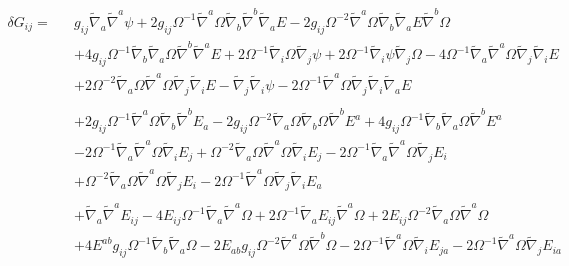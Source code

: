 \documentclass[10pt,letterpaper]{article}
\numberwithin{equation}{section}
\begin{document}
\begin{eqnarray}
\delta G_{ij}=&&g_{ij} \tilde{\nabla}_{a}\tilde{\nabla}^{a}\psi
 + 2 g_{ij} \Omega^{-1} \tilde{\nabla}^{a}\Omega \tilde{\nabla}_{b}\tilde{\nabla}^{b}\tilde{\nabla}_{a}E
 - 2 g_{ij} \Omega^{-2} \tilde{\nabla}^{a}\Omega \tilde{\nabla}_{b}\tilde{\nabla}_{a}E \tilde{\nabla}^{b}\Omega\nonumber\\
&& + 4 g_{ij} \Omega^{-1} \tilde{\nabla}_{b}\tilde{\nabla}_{a}\Omega \tilde{\nabla}^{b}\tilde{\nabla}^{a}E
 + 2 \Omega^{-1} \tilde{\nabla}_{i}\Omega \tilde{\nabla}_{j}\psi
 + 2 \Omega^{-1} \tilde{\nabla}_{i}\psi \tilde{\nabla}_{j}\Omega
 - 4 \Omega^{-1} \tilde{\nabla}_{a}\tilde{\nabla}^{a}\Omega \tilde{\nabla}_{j}\tilde{\nabla}_{i}E
\nonumber\\
&& + 2 \Omega^{-2} \tilde{\nabla}_{a}\Omega \tilde{\nabla}^{a}\Omega \tilde{\nabla}_{j}\tilde{\nabla}_{i}E
 -  \tilde{\nabla}_{j}\tilde{\nabla}_{i}\psi
 - 2 \Omega^{-1} \tilde{\nabla}^{a}\Omega \tilde{\nabla}_{j}\tilde{\nabla}_{i}\tilde{\nabla}_{a}E
\nonumber\\ \nonumber\\
&& +2 g_{ij} \Omega^{-1} \tilde{\nabla}^{a}\Omega \tilde{\nabla}_{b}\tilde{\nabla}^{b}E_{a}
 - 2 g_{ij} \Omega^{-2} \tilde{\nabla}_{a}\Omega \tilde{\nabla}_{b}\Omega \tilde{\nabla}^{b}E^{a}
 + 4 g_{ij} \Omega^{-1} \tilde{\nabla}_{b}\tilde{\nabla}_{a}\Omega \tilde{\nabla}^{b}E^{a}
\nonumber\\
&& - 2 \Omega^{-1} \tilde{\nabla}_{a}\tilde{\nabla}^{a}\Omega \tilde{\nabla}_{i}E_{j}
 + \Omega^{-2} \tilde{\nabla}_{a}\Omega \tilde{\nabla}^{a}\Omega \tilde{\nabla}_{i}E_{j}
 - 2 \Omega^{-1} \tilde{\nabla}_{a}\tilde{\nabla}^{a}\Omega \tilde{\nabla}_{j}E_{i}
\nonumber\\
&& + \Omega^{-2} \tilde{\nabla}_{a}\Omega \tilde{\nabla}^{a}\Omega \tilde{\nabla}_{j}E_{i}
 - 2 \Omega^{-1} \tilde{\nabla}^{a}\Omega \tilde{\nabla}_{j}\tilde{\nabla}_{i}E_{a}
\nonumber \\ \nonumber\\
&&+\tilde{\nabla}_{a}\tilde{\nabla}^{a}E_{ij}
 - 4 E_{ij} \Omega^{-1} \tilde{\nabla}_{a}\tilde{\nabla}^{a}\Omega
 + 2 \Omega^{-1} \tilde{\nabla}_{a}E_{ij} \tilde{\nabla}^{a}\Omega
 + 2 E_{ij} \Omega^{-2} \tilde{\nabla}_{a}\Omega \tilde{\nabla}^{a}\Omega\nonumber\\
&& + 4 E^{ab} g_{ij} \Omega^{-1} \tilde{\nabla}_{b}\tilde{\nabla}_{a}\Omega
 - 2 E_{ab} g_{ij} \Omega^{-2} \tilde{\nabla}^{a}\Omega \tilde{\nabla}^{b}\Omega
 - 2 \Omega^{-1} \tilde{\nabla}^{a}\Omega \tilde{\nabla}_{i}E_{ja}
 - 2 \Omega^{-1} \tilde{\nabla}^{a}\Omega \tilde{\nabla}_{j}E_{ia}
\end{eqnarray}
\end{document}
